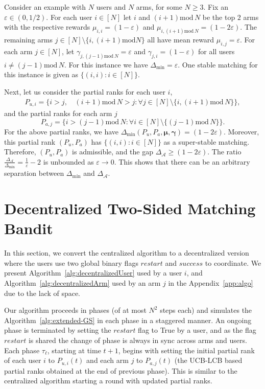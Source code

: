 \documentclass{article}
\begin{document}
 Consider an example with $N$
 users and $N$ arms, for some $N \geq 3$. Fix an $\varepsilon \in (0, 1/2)$. For each user $i \in [N]$ let $i$ and $(i+1) \mathrm{mod}\, N$ be the top $2$ arms with the respective rewards $\mu_{i,i} = (1 - \varepsilon)$ and $\mu_{i,(i+1) \mathrm{mod}\, N} = (1 - 2\varepsilon)$. The remaining arms $j \in [N]\setminus \{i, (i+1) \mathrm{mod} N\}$ all have mean reward $\mu_{i,j} = \varepsilon$. For each arm $j \in [N]$, let  $\gamma_{j,(j - 1) \mathrm{mod}\, N} = \varepsilon$ and $\gamma_{j,i} = ( 1 - \varepsilon)$ for all users $i \neq (j - 1) \mathrm{mod}\, N$. 
 For this instance we have $\Delta_{\min} = \varepsilon$. One stable matching for this instance is given as $\{(i,i): i \in [N]\}$.
 
 Next, let us consider the partial ranks for each user $i$,
 \begin{align*}
     P_{u,i} = \{i > j,\, &(i + 1)\mathrm{mod}\, N > j: \forall j \in [N] \setminus \{i, (i+1) \mathrm{mod}\,N\} \},
 \end{align*}
 and  the partial ranks for each arm $j$
 $$
 P_{a,j} = \{i > (j - 1)\mathrm{mod}\, N: \forall i \in [N] \setminus \{(j - 1) \mathrm{mod}\, N\} \}.
 $$
 For the above partial ranks, we have $\Delta_{\min}(P_u, P_a, \boldsymbol{\mu}, \boldsymbol{\gamma}) = (1- 2 \varepsilon)$. Moreover, this partial rank $(P_u, P_a)$ has $\{(i,i): i \in [N]\}$
 as a super-stable matching. Therefore, $(P_u, P_a)$ is admissible, and the gap $\Delta_{\mathcal{A}} \geq (1 - 2 \varepsilon)$. The ratio $\tfrac{\Delta_{\mathcal{A}}}{\Delta_{\min}} = \tfrac{1}{\varepsilon} - 2$ is unbounded as $\varepsilon \to 0$. This shows that there can be an arbitrary separation between $\Delta_{\min}$ and $\Delta_{\mathcal{A}}$.

\section{Decentralized Two-Sided Matching Bandit}
In this section, we convert the centralized algorithm to a decentralized version where the users use two global binary flags $restart$ and $success$ to coordinate. We present Algorithm~\ref{alg:decentralizedUser} used by a user $i$, and Algorithm~\ref{alg:decentralizedArm} used by an arm $j$ in the Appendix~\ref{app:algo} due to the lack of space.

Our algorithm proceeds in phases (of at most $N^2$ steps each) and simulates the Algorithm~\ref{alg:extended-GS} in each phase in a staggered manner. An ongoing phase is terminated by setting the $restart$ flag to True by a user, and as the flag $restart$ is shared the change of phase is always in sync across arms and users.  Each phase $\tau_{\ell}$, starting at time $t + 1$, begins with setting the initial partial rank of each user $i$ to $P_{u,i}(t)$ and each arm $j$ to $P_{a,j}(t)$ (the UCB-LCB based partial ranks obtained at the end of previous phase). This is similar to the centralized algorithm starting a round with updated partial ranks.  
\end{document}
